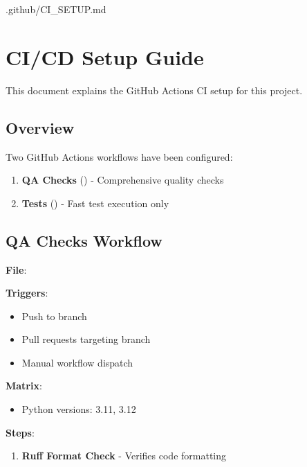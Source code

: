 \begin{relocated}{.github/CI_SETUP.md}
\section{CI/CD Setup Guide}\label{um:flow:ci-setup}

This document explains the GitHub Actions CI setup for this project.

\subsection{Overview}\label{um:flow:ci-setup:overview}

Two GitHub Actions workflows have been configured:

\begin{enumerate}
\def\labelenumi{\arabic{enumi}.}
\tightlist
\item
  \textbf{QA Checks} () - Comprehensive quality
  checks
\item
  \textbf{Tests} () - Fast test execution only
\end{enumerate}

\subsection{QA Checks Workflow}\label{um:flow:ci-setup:qa-checks-workflow}

\textbf{File}: 

\textbf{Triggers}:

\begin{itemize}
\tightlist
\item
  Push to  branch
\item
  Pull requests targeting  branch
\item
  Manual workflow dispatch
\end{itemize}

\textbf{Matrix}:

\begin{itemize}
\tightlist
\item
  Python versions: 3.11, 3.12
\end{itemize}

\textbf{Steps}:

\begin{enumerate}
\def\labelenumi{\arabic{enumi}.}
\item
  \textbf{Ruff Format Check} - Verifies code formatting


\end{enumerate}
\end{relocated}
